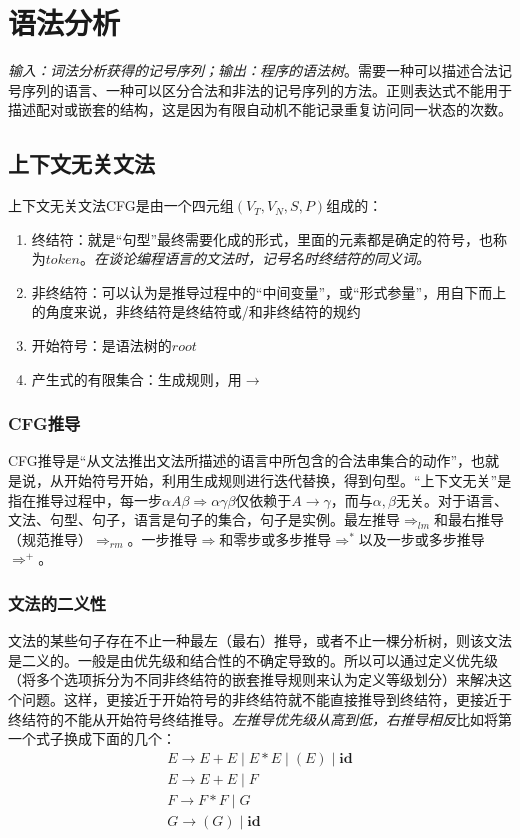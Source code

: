 \documentclass[]{report}
\begin{document}
	\chapter{语法分析}
	\textit{输入：词法分析获得的记号序列；输出：程序的语法树}。需要一种可以描述合法记号序列的语言、一种可以区分合法和非法的记号序列的方法。正则表达式不能用于描述配对或嵌套的结构，这是因为有限自动机不能记录重复访问同一状态的次数。\par
	\section{上下文无关文法}
		上下文无关文法CFG是由一个四元组$(V_T,V_N,S,P)$组成的：
		\begin{enumerate}
			\item 终结符：就是“句型”最终需要化成的形式，里面的元素都是确定的符号，也称为$token$。\textit{在谈论编程语言的文法时，记号名时终结符的同义词。}
			\item 非终结符：可以认为是推导过程中的“中间变量”，或“形式参量”，用自下而上的角度来说，非终结符是终结符或/和非终结符的规约
			\item 开始符号：是语法树的$root$
			\item 产生式的有限集合：生成规则，用$\to$
		\end{enumerate}
		\subsection{CFG推导}
		CFG推导是“从文法推出文法所描述的语言中所包含的合法串集合的动作”，也就是说，从开始符号开始，利用生成规则进行迭代替换，得到句型。“上下文无关”是指在推导过程中，每一步$\alpha A\beta\Rightarrow\alpha\gamma\beta$仅依赖于$A\to\gamma$，而与$\alpha,\beta$无关。对于语言、文法、句型、句子，语言是句子的集合，句子是实例。最左推导$\Rightarrow_{lm}$和最右推导（规范推导）$\Rightarrow_{rm}$。一步推导$\Rightarrow$和零步或多步推导$\Rightarrow^*$以及一步或多步推导$\Rightarrow^+$。\par
		\subsection{文法的二义性}
		文法的某些句子存在不止一种最左（最右）推导，或者不止一棵分析树，则该文法是二义的。一般是由优先级和结合性的不确定导致的。所以可以通过定义优先级（将多个选项拆分为不同非终结符的嵌套推导规则来认为定义等级划分）来解决这个问题。这样，更接近于开始符号的非终结符就不能直接推导到终结符，更接近于终结符的不能从开始符号终结推导。\textit{左推导优先级从高到低，右推导相反}比如将第一个式子换成下面的几个：
		\[\begin{gathered}
			E\to E+E\mid E*E\mid(E)\mid\mathbf{id}\\
			E\to E+E\mid F\\
			F\to F*F\mid G\\
			G\to (G)\mid\mathbf{id}
		\end{gathered}\]
\end{document}
